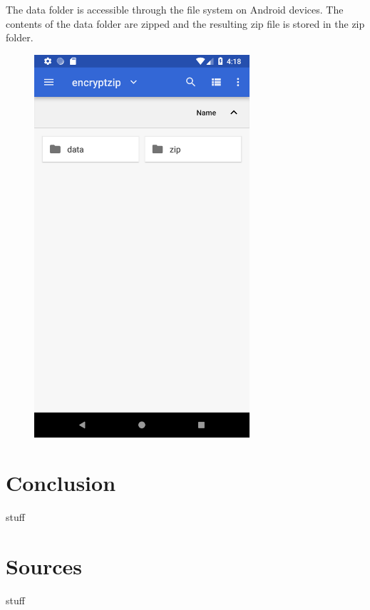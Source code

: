 \documentclass[10pt,a4paper]{article}
\begin{document}
The data folder is accessible through the file system on Android devices. The contents of the data folder are zipped and the resulting zip file is stored in the zip folder.
\begin{figure}[H]
\includegraphics[width=8cm]{file1}
\end{figure}

\section{Conclusion}
stuff
\section{Sources}
stuff
\end{document}
